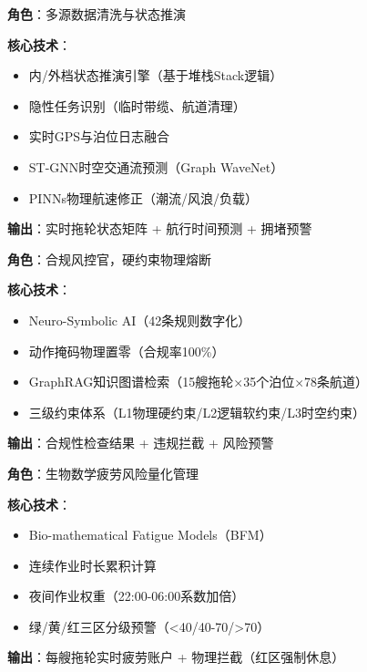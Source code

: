 \documentclass[12pt,a4paper]{article}
\begin{document}
\begin{tcolorbox}[colback=blue!5!white,colframe=blue!75!black,title=\textbf{Slave Agent 1：全域感知智能体（Perception Agent）}]
\textbf{角色}：多源数据清洗与状态推演

\textbf{核心技术}：
\begin{itemize}
    \item 内/外档状态推演引擎（基于堆栈Stack逻辑）
    \item 隐性任务识别（临时带缆、航道清理）
    \item 实时GPS与泊位日志融合
    \item ST-GNN时空交通流预测（Graph WaveNet）
    \item PINNs物理航速修正（潮流/风浪/负载）
\end{itemize}

\textbf{输出}：实时拖轮状态矩阵 + 航行时间预测 + 拥堵预警
\end{tcolorbox}

\vspace{0.5cm}

\begin{tcolorbox}[colback=red!5!white,colframe=red!75!black,title=\textbf{Slave Agent 2：规则与知识守护智能体（Rule Agent）}]
\textbf{角色}：合规风控官，硬约束物理熔断

\textbf{核心技术}：
\begin{itemize}
    \item Neuro-Symbolic AI（42条规则数字化）
    \item 动作掩码物理置零（合规率100\%）
    \item GraphRAG知识图谱检索（15艘拖轮$\times$35个泊位$\times$78条航道）
    \item 三级约束体系（L1物理硬约束/L2逻辑软约束/L3时空约束）
\end{itemize}

\textbf{输出}：合规性检查结果 + 违规拦截 + 风险预警
\end{tcolorbox}

\vspace{0.5cm}

\begin{tcolorbox}[colback=orange!5!white,colframe=orange!75!black,title=\textbf{Slave Agent 3：疲劳度管理智能体（FRMS Agent）}]
\textbf{角色}：生物数学疲劳风险量化管理

\textbf{核心技术}：
\begin{itemize}
    \item Bio-mathematical Fatigue Models（BFM）
    \item 连续作业时长累积计算
    \item 夜间作业权重（22:00-06:00系数加倍）
    \item 绿/黄/红三区分级预警（<40/40-70/>70）
\end{itemize}

\textbf{输出}：每艘拖轮实时疲劳账户 + 物理拦截（红区强制休息）
\end{tcolorbox}
\end{document}
